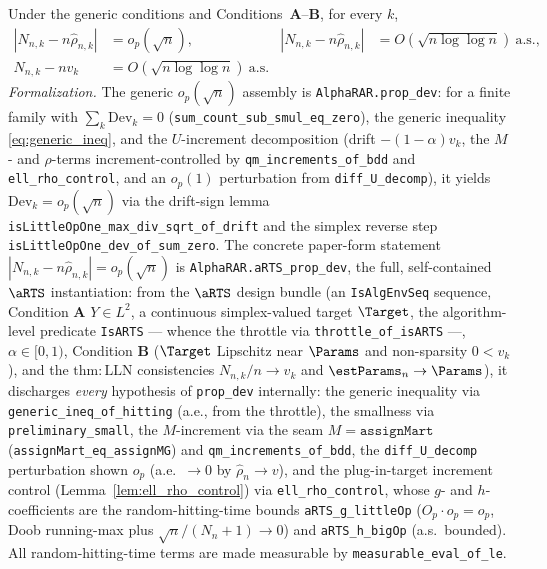\begin{lemma}\label{lem:prop_dev}
\leanok
{}
Under the generic conditions and Conditions~\textbf{A}--\textbf{B}, for every $k$,
\begin{align*}
  |N_{n,k} - n\hat{\rho}_{n,k}| &= o_p(\sqrt n), &
  |N_{n,k} - n\hat{\rho}_{n,k}| &= O(\sqrt{n\log\log n})\ \text{a.s.}, \\
  N_{n,k} - n v_k &= O(\sqrt{n\log\log n})\ \text{a.s.}
\end{align*}
\emph{Formalization.} The generic $o_p(\sqrt n)$ assembly is \texttt{AlphaRAR.prop\_dev}: for a finite
family with $\sum_k \mathrm{Dev}_k = 0$ (\texttt{sum\_count\_sub\_smul\_eq\_zero}), the generic
inequality \eqref{eq:generic_ineq}, and the $U$-increment decomposition (drift $-(1-\alpha)v_k$, the
$M$- and $\rho$-terms increment-controlled by \texttt{qm\_increments\_of\_bdd} and
\texttt{ell\_rho\_control}, and an $o_p(1)$ perturbation from \texttt{diff\_U\_decomp}), it yields
$\mathrm{Dev}_k=o_p(\sqrt n)$ via the drift-sign lemma
\texttt{isLittleOpOne\_max\_div\_sqrt\_of\_drift} and the simplex reverse step
\texttt{isLittleOpOne\_dev\_of\_sum\_zero}. The concrete paper-form statement
$|N_{n,k}-n\hat\rho_{n,k}|=o_p(\sqrt n)$ is \texttt{AlphaRAR.aRTS\_prop\_dev}, the full, self-contained
$\aRTS$ instantiation: from the $\aRTS$ design bundle (an \texttt{IsAlgEnvSeq} sequence, Condition
\textbf{A} $Y\in L^2$, a continuous simplex-valued target $\Target$, the algorithm-level predicate
\texttt{IsARTS} --- whence the throttle via \texttt{throttle\_of\_isARTS} ---, $\alpha\in[0,1)$,
Condition \textbf{B} ($\Target$ Lipschitz near $\Params$ and non-sparsity $0<v_k$), and the
$\mathrm{thm{:}LLN}$ consistencies $N_{n,k}/n\to v_k$ and $\estParams_n\to\Params$), it discharges
\emph{every} hypothesis of \texttt{prop\_dev} internally: the generic inequality via
\texttt{generic\_ineq\_of\_hitting} (a.e., from the throttle), the smallness via
\texttt{preliminary\_small}, the $M$-increment via the seam $M=\texttt{assignMart}$
(\texttt{assignMart\_eq\_assignMG}) and \texttt{qm\_increments\_of\_bdd}, the \texttt{diff\_U\_decomp}
perturbation shown $o_p$ (a.e.\ $\to0$ by $\hat\rho_n\to v$), and the plug-in-target increment control
(Lemma~\ref{lem:ell_rho_control}) via \texttt{ell\_rho\_control}, whose $g$- and $h$-coefficients are
the random-hitting-time bounds \texttt{aRTS\_g\_littleOp} ($O_p\cdot o_p=o_p$, Doob running-max plus
$\sqrt n/(N_n+1)\to0$) and \texttt{aRTS\_h\_bigOp} (a.s.\ bounded). All random-hitting-time terms are
made measurable by \texttt{measurable\_eval\_of\_le}.


\end{lemma}
